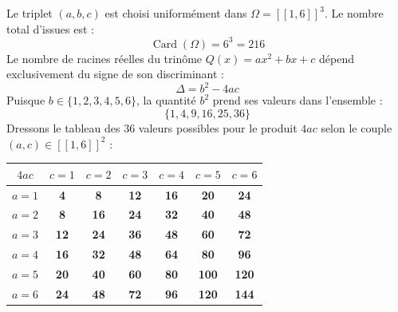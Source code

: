 \documentclass[11pt,a4paper]{article}
\begin{document}
\begin{correctionbox}
Le triplet $(a, b, c)$ est choisi uniformément dans $\Omega = [\![1, 6]\!]^3$. Le nombre total d'issues est :
\[
\operatorname{Card}(\Omega) = 6^3 = 216
\]
Le nombre de racines réelles du trinôme $Q(x) = ax^2 + bx + c$ dépend exclusivement du signe de son discriminant :
\[
\Delta = b^2 - 4ac
\]
Puisque $b \in \{1, 2, 3, 4, 5, 6\}$, la quantité $b^2$ prend ses valeurs dans l'ensemble :
\[
\{1, 4, 9, 16, 25, 36\}
\]
Dressons le tableau des $36$ valeurs possibles pour le produit $4ac$ selon le couple $(a, c) \in [\![1, 6]\!]^2$ :
\begin{center}
\renewcommand{\arraystretch}{1.2}
\begin{tabular}{|c|c|c|c|c|c|c|}
    \hline
    $4ac$ & $c = 1$ & $c = 2$ & $c = 3$ & $c = 4$ & $c = 5$ & $c = 6$ \\
    \hline
    $a = 1$ & \textbf{4} & \textbf{8} & \textbf{12} & \textbf{16} & \textbf{20} & \textbf{24} \\
    \hline
    $a = 2$ & \textbf{8} & \textbf{16} & \textbf{24} & \textbf{32} & \textbf{40} & \textbf{48} \\
    \hline
    $a = 3$ & \textbf{12} & \textbf{24} & \textbf{36} & \textbf{48} & \textbf{60} & \textbf{72} \\
    \hline
    $a = 4$ & \textbf{16} & \textbf{32} & \textbf{48} & \textbf{64} & \textbf{80} & \textbf{96} \\
    \hline
    $a = 5$ & \textbf{20} & \textbf{40} & \textbf{60} & \textbf{80} & \textbf{100} & \textbf{120} \\
    \hline
    $a = 6$ & \textbf{24} & \textbf{48} & \textbf{72} & \textbf{96} & \textbf{120} & \textbf{144} \\
    \hline
\end{tabular}
\end{center}


\end{correctionbox}
\end{document}
